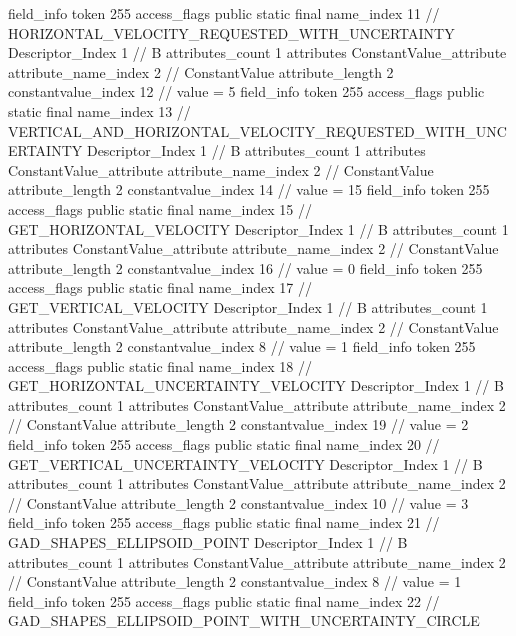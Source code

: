 {{{{{{{				}
				}
			}
			field_info {
				token	255
				access_flags	public static final
				name_index	11		// HORIZONTAL_VELOCITY_REQUESTED_WITH_UNCERTAINTY
				Descriptor_Index	1		// B
				attributes_count	1
				attributes {
				ConstantValue_attribute {
					attribute_name_index	2		// ConstantValue
					attribute_length	2
					constantvalue_index	12		// value = 5
				}
				}
			}
			field_info {
				token	255
				access_flags	public static final
				name_index	13		// VERTICAL_AND_HORIZONTAL_VELOCITY_REQUESTED_WITH_UNCERTAINTY
				Descriptor_Index	1		// B
				attributes_count	1
				attributes {
				ConstantValue_attribute {
					attribute_name_index	2		// ConstantValue
					attribute_length	2
					constantvalue_index	14		// value = 15
				}
				}
			}
			field_info {
				token	255
				access_flags	public static final
				name_index	15		// GET_HORIZONTAL_VELOCITY
				Descriptor_Index	1		// B
				attributes_count	1
				attributes {
				ConstantValue_attribute {
					attribute_name_index	2		// ConstantValue
					attribute_length	2
					constantvalue_index	16		// value = 0
				}
				}
			}
			field_info {
				token	255
				access_flags	public static final
				name_index	17		// GET_VERTICAL_VELOCITY
				Descriptor_Index	1		// B
				attributes_count	1
				attributes {
				ConstantValue_attribute {
					attribute_name_index	2		// ConstantValue
					attribute_length	2
					constantvalue_index	8		// value = 1
				}
				}
			}
			field_info {
				token	255
				access_flags	public static final
				name_index	18		// GET_HORIZONTAL_UNCERTAINTY_VELOCITY
				Descriptor_Index	1		// B
				attributes_count	1
				attributes {
				ConstantValue_attribute {
					attribute_name_index	2		// ConstantValue
					attribute_length	2
					constantvalue_index	19		// value = 2
				}
				}
			}
			field_info {
				token	255
				access_flags	public static final
				name_index	20		// GET_VERTICAL_UNCERTAINTY_VELOCITY
				Descriptor_Index	1		// B
				attributes_count	1
				attributes {
				ConstantValue_attribute {
					attribute_name_index	2		// ConstantValue
					attribute_length	2
					constantvalue_index	10		// value = 3
				}
				}
			}
			field_info {
				token	255
				access_flags	public static final
				name_index	21		// GAD_SHAPES_ELLIPSOID_POINT
				Descriptor_Index	1		// B
				attributes_count	1
				attributes {
				ConstantValue_attribute {
					attribute_name_index	2		// ConstantValue
					attribute_length	2
					constantvalue_index	8		// value = 1
				}
				}
			}
			field_info {
				token	255
				access_flags	public static final
				name_index	22		// GAD_SHAPES_ELLIPSOID_POINT_WITH_UNCERTAINTY_CIRCLE
}}}}}
